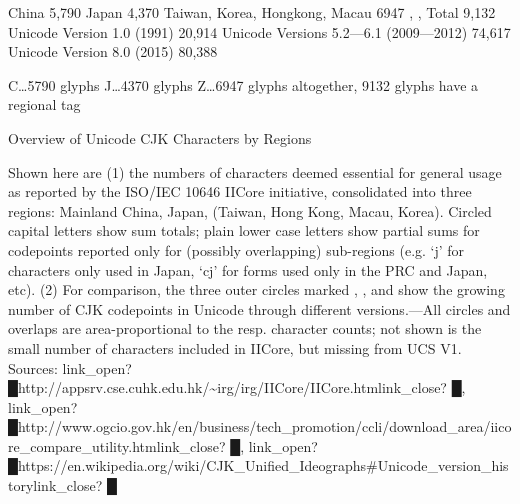 \begin{multicols}{2}
   China   5,790
   Japan   4,370
   Taiwan, Korea, Hongkong, Macau  6947
, ,  Total   9,132
 Unicode Version 1.0 (1991)    20,914
 Unicode Versions 5.2—6.1 (2009—2012)  74,617
 Unicode Version 8.0 (2015)    80,388\mktsShowpar\par
C…5790 glyphs
J…4370 glyphs
Z…6947 glyphs
altogether, 9132 glyphs have a regional tag\mktsShowpar\par
Overview of Unicode CJK Characters by Regions\mktsShowpar\par
Shown here are (1) the numbers of characters deemed essential for general usage as reported by the ISO/IEC 10646 IICore initiative, consolidated into three regions:  Mainland China,  Japan,  (Taiwan, Hong Kong, Macau, Korea). Circled capital letters show sum totals; plain lower case letters show partial sums for codepoints reported only for (possibly overlapping) sub-regions (e.g. ‘j’ for characters only used in Japan, ‘cj’ for forms used only in the PRC and Japan, etc). (2) For comparison, the three outer circles marked , , and  show the growing number of CJK codepoints in Unicode through different versions.—All circles and overlaps are area-proportional to the resp. character counts; not shown is the small number of characters included in IICore, but missing from UCS V1. Sources: {\mktsStyleBold\color{violet}{%
\mktsStyleSymbol}link\_open? {\mktsStyleSymbol█}}http://appsrv.cse.cuhk.edu.hk/\textasciitilde{}irg/irg/IICore/IICore.htm{\mktsStyleBold\color{violet}{%
\mktsStyleSymbol}link\_close? {\mktsStyleSymbol█}}, {\mktsStyleBold\color{violet}{%
\mktsStyleSymbol}link\_open? {\mktsStyleSymbol█}}http://www.ogcio.gov.hk/en/business/tech\_promotion/ccli/download\_area/iicore\_compare\_utility.htm{\mktsStyleBold\color{violet}{%
\mktsStyleSymbol}link\_close? {\mktsStyleSymbol█}}, {\mktsStyleBold\color{violet}{%
\mktsStyleSymbol}link\_open? {\mktsStyleSymbol█}}https://en.wikipedia.org/wiki/CJK\_Unified\_Ideographs\#Unicode\_version\_history{\mktsStyleBold\color{violet}{%
\mktsStyleSymbol}link\_close? {\mktsStyleSymbol█}}\mktsShowpar\par


\end{multicols}

